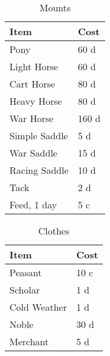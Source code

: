 \documentclass[a4paper,11pt,oneside]{book}
\begin{document}
\begin{table}[ht]
	\centering
	\caption{Mounts}
	\begin{tabular}{|l|l|}
		\hline
		Item & Cost\\ [0.5ex]
		\hline
		Pony & 60 d\\
		Light Horse & 60 d\\
		Cart Horse & 80 d\\
		Heavy Horse & 80 d\\
		War Horse & 160 d\\
		\hline
		Simple Saddle & 5 d\\
		War Saddle & 15 d\\
		Racing Saddle & 10 d\\
		Tack & 2 d\\
		Feed, 1 day & 5 c\\
		\hline
	\end{tabular}
\end{table}

\begin{table}[ht]
	\centering
	\caption{Clothes}
	\begin{tabular}{|l|l|}
		\hline
		Item & Cost\\ [0.5ex]
		\hline
		Peasant & 10 c\\
		Scholar & 1 d\\
		Cold Weather & 1 d\\
		Noble & 30 d\\
		Merchant & 5 d\\
		\hline
	\end{tabular}
\end{table}





\listoftables
\end{document}
